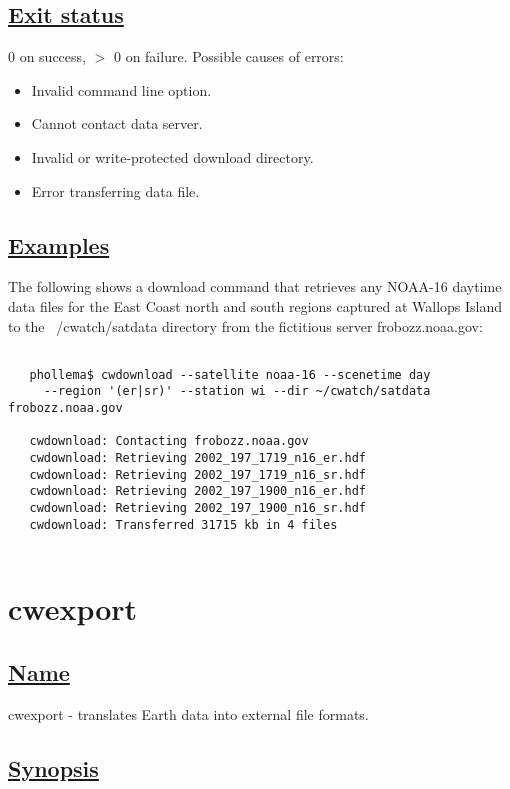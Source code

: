 \subsection*{\underline{Exit status}}


  0 on success, $>$ 0 on failure. Possible causes of errors:
\begin{itemize}
\item  Invalid command line option. 
\item  Cannot contact data server. 
\item  Invalid or write-protected download directory. 
\item  Error transferring data file. 

\end{itemize}
\subsection*{\underline{Examples}}


  The following shows a download command that retrieves any NOAA-16 daytime data files for the East Coast north and south regions captured at Wallops Island to the ~/cwatch/satdata directory from the fictitious server frobozz.noaa.gov:
\begin{verbatim}

   phollema$ cwdownload --satellite noaa-16 --scenetime day 
     --region '(er|sr)' --station wi --dir ~/cwatch/satdata frobozz.noaa.gov

   cwdownload: Contacting frobozz.noaa.gov
   cwdownload: Retrieving 2002_197_1719_n16_er.hdf
   cwdownload: Retrieving 2002_197_1719_n16_sr.hdf
   cwdownload: Retrieving 2002_197_1900_n16_er.hdf
   cwdownload: Retrieving 2002_197_1900_n16_sr.hdf
   cwdownload: Transferred 31715 kb in 4 files
 
\end{verbatim}

\newpage
\section{cwexport} \hypertarget{cwexport}{}
\subsection*{\underline{Name}}


   cwexport - translates Earth data into external file formats.  
\subsection*{\underline{Synopsis}}


